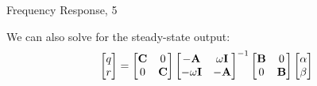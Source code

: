 \documentclass{beamer}
\begin{document}
\begin{frame}{Frequency Response, 5}
\begin{flushleft}
		We can also solve for the steady-state output:
		\begin{align}
			\begin{bmatrix}
				q \\  r
			\end{bmatrix}
			= 
			\begin{bmatrix}
				\mathbf{C} & 0 \\  0 & \mathbf{C}
			\end{bmatrix}
			\begin{bmatrix}
				-\mathbf{A} & \omega \mathbf{I} \\
				-\omega \mathbf{I} & -\mathbf{A}
			\end{bmatrix}^{-1}
			\begin{bmatrix}
				\mathbf{B} & 0 \\  0 & \mathbf{B}
			\end{bmatrix}
			\begin{bmatrix}
				\alpha \\   \beta
			\end{bmatrix}
		\end{align}		
		
		
	\end{flushleft}
\end{frame}
\end{document}
